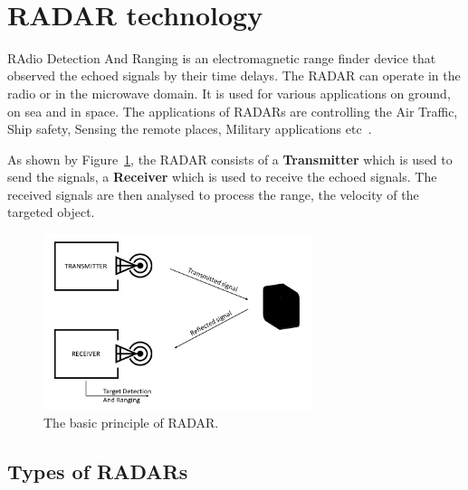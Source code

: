 \\

\section{RADAR technology}
RAdio Detection And Ranging is an electromagnetic range finder device that observed the echoed signals by their time delays.  The RADAR can operate in the radio or in the microwave domain. 
It is used for various applications on ground, on sea and in space. The applications of RADARs are controlling the Air Traffic, Ship safety, Sensing the remote places, Military applications etc~\cite{RADAR}.

As shown by Figure~\ref{fig:basic_principle}, the RADAR consists of a \textbf{Transmitter} which is used to send the signals, a \textbf{Receiver} which is used to receive the echoed signals.
The received signals are then analysed to process the range, the velocity of the targeted object. 

\begin{figure}[ht]
  \begin{center}
    \includegraphics[width=0.70\textwidth]{Master's thesis/images/basic_block1.png} 
    \caption{The basic principle of RADAR.}
    \label{fig:basic_principle}
  \end{center}
\end{figure}

\subsection{Types of RADARs}

